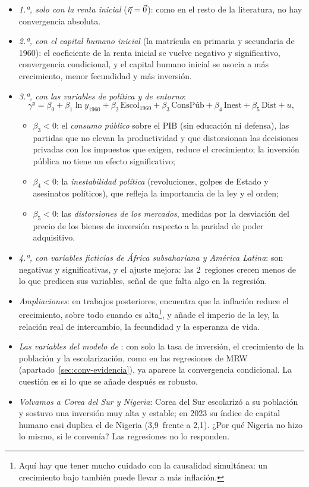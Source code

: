 \documentclass[11pt]{article}
\begin{document}
\begin{itemize}
\item \emph{1.ª, solo con la renta inicial} ($\vec{\eta}=\vec{0}$): como en el resto de la literatura, no hay convergencia absoluta.
\item \emph{2.ª, con el capital humano inicial} (la matrícula en primaria y secundaria de 1960): el coeficiente de la renta inicial se vuelve negativo y significativo, convergencia condicional, y el capital humano inicial se asocia a más crecimiento, menor fecundidad y más inversión.
\item \emph{3.ª, con las variables de política y de entorno}:
  \[
  \gamma^{y}=\beta_0+\beta_1\ln y_{1960}+\beta_2\,\text{Escol}_{1960}+\beta_3\,\text{ConsPúb}+\beta_4\,\text{Inest}+\beta_5\,\text{Dist}+u ,
  \]
  \begin{itemize}
  \item $\beta_3<0$: el \emph{consumo público} sobre el PIB (sin educación ni defensa), las partidas que no elevan la productividad y que distorsionan las decisiones privadas con los impuestos que exigen, reduce el crecimiento; la inversión pública no tiene un efecto significativo;
  \item $\beta_4<0$: la \emph{inestabilidad política} (revoluciones, golpes de Estado y asesinatos políticos), que refleja la importancia de la ley y el orden;
  \item $\beta_5<0$: las \emph{distorsiones de los mercados}, medidas por la desviación del precio de los bienes de inversión respecto a la paridad de poder adquisitivo.
  \end{itemize}
\item \emph{4.ª, con variables ficticias de África subsahariana y América Latina}: son negativas y significativas, y el ajuste mejora: las 2~regiones crecen menos de lo que predicen sus variables, señal de que falta algo en la regresión.
\item \emph{Ampliaciones}: en trabajos posteriores, \textcite{Barro1995Inflation} encuentra que la inflación reduce el crecimiento, sobre todo cuando es alta\footnote{Aquí hay que tener mucho cuidado con la causalidad simultánea: un crecimiento bajo también puede llevar a más inflación.}, y \textcite{Barro1997Determinants} añade el imperio de la ley, la relación real de intercambio, la fecundidad y la esperanza de vida.
\item \emph{Las variables del modelo de }: con solo la tasa de inversión, el crecimiento de la población y la escolarización, como en las regresiones de MRW (apartado~\ref{sec:conv-evidencia}), ya aparece la convergencia condicional. La cuestión es si lo que se añade después es robusto.
\item \emph{Volvamos a Corea del Sur y Nigeria}: Corea del Sur escolarizó a su población y sostuvo una inversión muy alta y estable; en 2023 su índice de capital humano casi duplica el de Nigeria (3,9~frente a 2,1)\nocite{GGDC2025PWT}. ¿Por qué Nigeria no hizo lo mismo, si le convenía? Las regresiones no lo responden.
\end{itemize}
\end{document}
